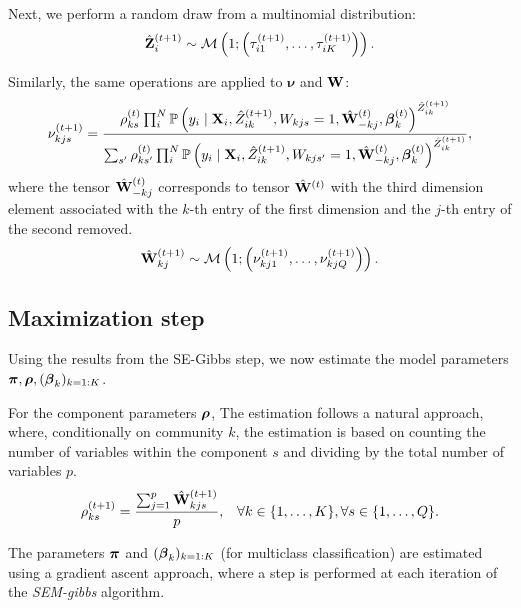 Next, we perform a random draw from a multinomial distribution:
\begin{equation}
    \hat{\mathbf{Z}}^{(t+1)}_{i} \sim \operatorname{\mathcal{M}}\left(1; \left(\tau^{(t+1)}_{i1},\dots,\tau^{(t+1)}_{iK}\right) \right).
\end{equation}

Similarly, the same operations are applied to $\boldsymbol{\nu}$ and $\mathbf{W}$:
\begin{equation}
    \nu_{kjs}^{(t+1)} = \dfrac{\rho_{ks}^{(t)} \prod_i^N \operatorname{\mathbb{P}}\left(y_i \mid \mathbf{X}_i,\hat{Z}^{(t+1)}_{ik},W_{kjs}=1,\hat{\mathbf{W}}^{(t)}_{-kj}, \boldsymbol{\beta}^{(t)}_k\right)^{\hat{Z}^{(t+1)}_{ik}} }{\sum_{s'} \rho_{ks'}^{(t)} \prod_i^N \operatorname{\mathbb{P}}\left(y_i \mid \mathbf{X}_i,\hat{Z}^{(t+1)}_{ik},W_{kjs'}=1,\hat{\mathbf{W}}^{(t)}_{-kj}, \boldsymbol{\beta}^{(t)}_k\right)^{\hat{Z}^{(t+1)}_{ik}}},
    \label{eq: MoEBIUS_nu}
\end{equation}
where the tensor $\hat{\mathbf{W}}^{(t)}_{-kj}$ corresponds to tensor $\hat{\mathbf{W}}^{(t)}$ with the third dimension element associated with the $k$-th entry of the first dimension and the $j$-th entry of the second removed.
%
\begin{equation}
    \hat{\mathbf{W}}^{(t+1)}_{kj} \sim \operatorname{\mathcal{M}}\left(1; \left(\nu^{(t+1)}_{kj1},\dots,\nu^{(t+1)}_{kjQ}\right) \right).
\end{equation}
%
\subsection{Maximization step}
Using the results from the SE-Gibbs step, we now estimate the model parameters $\boldsymbol{\pi}, \boldsymbol{\rho}, (\boldsymbol{\beta}_k)_{k=1:K}$.

For the component parameters $\boldsymbol{\rho}$, The estimation follows a natural approach, where, conditionally on community $k$, the estimation is based on counting the number of variables within the component $s$ and dividing by the total number of variables $p$.
\begin{align}
    \rho_{ks}^{(t+1)} &= \dfrac{\sum_{j=1}^p \hat{\mathbf{W}}_{kjs}^{(t+1)}}{p},  &\forall k \in \{1,\dots,K\},\forall s \in \{1,\dots,Q\}.
    \label{eq: MoEBIUS_rho}
\end{align}

The parameters $\boldsymbol{\pi}$ and $(\boldsymbol{\beta}_k)_{k=1:K}$ (for multiclass classification) are estimated using a gradient ascent approach, where a step is performed at each iteration of the \textit{SEM-gibbs} algorithm.

